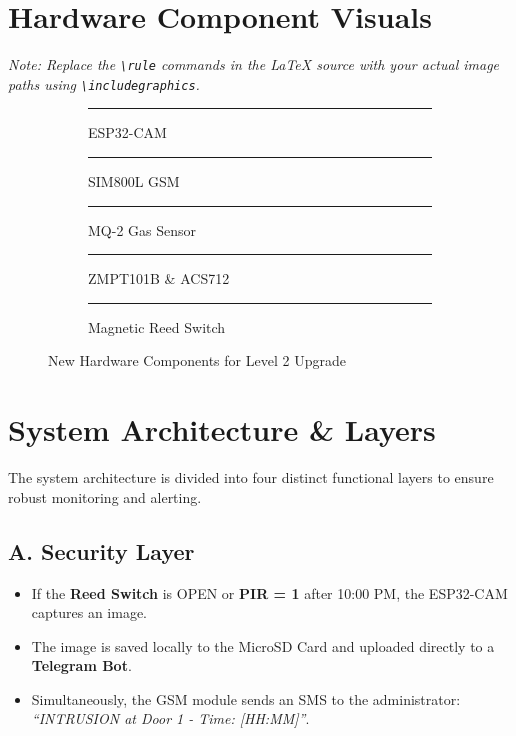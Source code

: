 \documentclass[12pt,a4paper]{article}
\begin{document}
\section{Hardware Component Visuals}
\textit{Note: Replace the \texttt{\textbackslash rule} commands in the LaTeX source with your actual image paths using \texttt{\textbackslash includegraphics}.}

\begin{figure}[H]
    \centering
    \begin{subfigure}{0.3\textwidth}
        \centering
        \rule{4cm}{3cm} %
        \caption{ESP32-CAM}
    \end{subfigure}
    \hfill
    \begin{subfigure}{0.3\textwidth}
        \centering
        \rule{4cm}{3cm} %
        \caption{SIM800L GSM}
    \end{subfigure}
    \hfill
    \begin{subfigure}{0.3\textwidth}
        \centering
        \rule{4cm}{3cm} %
        \caption{MQ-2 Gas Sensor}
    \end{subfigure}
    
    \vspace{0.5cm}
    \begin{subfigure}{0.45\textwidth}
        \centering
        \rule{4cm}{3cm} %
        \caption{ZMPT101B \& ACS712}
    \end{subfigure}
    \hfill
    \begin{subfigure}{0.45\textwidth}
        \centering
        \rule{4cm}{3cm} %
        \caption{Magnetic Reed Switch}
    \end{subfigure}
    
    \caption{New Hardware Components for Level 2 Upgrade}
    \label{fig:components}
\end{figure}

\section{System Architecture \& Layers}
The system architecture is divided into four distinct functional layers to ensure robust monitoring and alerting.

\subsection{A. Security Layer}
\begin{itemize}
    \item If the \textbf{Reed Switch} is OPEN or \textbf{PIR = 1} after 10:00 PM, the ESP32-CAM captures an image.
    \item The image is saved locally to the MicroSD Card and uploaded directly to a \textbf{Telegram Bot}.
    \item Simultaneously, the GSM module sends an SMS to the administrator: \textit{“INTRUSION at Door 1 - Time: [HH:MM]”}.
\end{itemize}
\end{document}
